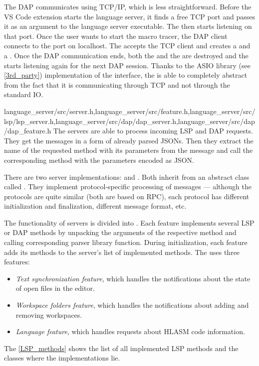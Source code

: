 The DAP communicates using TCP/IP, which is less straightforward. Before the VS Code extension starts the language server, it finds a free TCP port and passes it as an argument to the language server executable. The  then starts listening on that port. Once the user wants to start the macro tracer, the DAP client connects to the port on localhost. The  accepts the TCP client and creates a  and a . Once the DAP communication ends, both the  and the  are destroyed and the  starts listening again for the next DAP session. Thanks to the ASIO library (see \cref{3rd_party}) implementation of the  interface, the  is able to completely abstract from the fact that it is communicating through TCP and not through the standard IO.

{language\_server/src/server.h,language\_server/src/feature.h,language\_server/src/lsp/lsp\_server.h,language\_server/src/dap/dap\_server.h,language\_server/src/dap/dap\_feature.h}
The servers are able to process incoming LSP and DAP requests. They get the messages in a form of already parsed JSONs. Then they extract the name of the requested method with its parameters from the message and call the corresponding method with the parameters encoded as JSON.

There are two server implementations:  and . Both inherit from an abstract class called . They implement protocol-specific processing of messages --- although the protocols are quite similar (both are based on RPC), each protocol has different initialization and finalization, different message format, etc.

The functionality of servers is divided into . Each feature implements several LSP or DAP methods by unpacking the arguments of the respective method and calling corresponding parser library function. During initialization, each feature adds its methods to the server's list of implemented methods. The  uses three features:
\begin{itemize}
	\item \emph{Text synchronization feature}, which handles the notifications about the state of open files in the editor.
	\item \emph{Workspace folders feature}, which handles the notifications about adding and removing workspaces.
	\item \emph{Language feature}, which handles requests about HLASM code information.
\end{itemize}
The \cref{LSP_methods} shows the list of all implemented LSP methods and the classes where the implementations lie.

